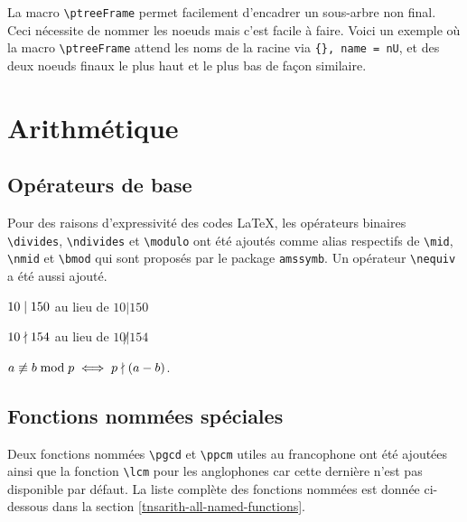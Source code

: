 \documentclass[12pt,a4paper]{book}
\makeatletter
\newcommand\env[1]{\texttt{#1}}
\newcommand\macro[1]{\env{\textbackslash{}#1}}
\theoremstyle{definition}
\newcounter{paraexample}[subsubsection]
\newcommand\@newexample@abstract[2]{%
	\paragraph{%
		#1%
		\if\relax\detokenize{#2}\relax\else {} -- #2\fi%
	}%
}
\newcommand\newparaexample{\@ifstar{\@newparaexample@star}{\@newparaexample@no@star}}
\newcommand\@newparaexample@no@star[1]{%
	\refstepcounter{paraexample}%
	\@newexample@abstract{Exemple \theparaexample}{#1}%
}
\newcommand\@newparaexample@star[1]{%
	\@newexample@abstract{Exemple}{#1}%
}
\makeatother
\begin{document}
{{




\newparaexample{Des cadres non finaux}


La macro \macro{ptreeFrame} permet facilement d'encadrer un sous-arbre non final.
Ceci nécessite de nommer les noeuds mais c'est facile à faire.
Voici un exemple où la macro \macro{ptreeFrame} attend les noms de la racine via \verb#{}, name = nU#, et des deux noeuds finaux le plus haut et le plus bas de façon similaire.

\chapter{Arithmétique}

\section{Opérateurs de base}

Pour des raisons d'expressivité des codes \LaTeX{}, les opérateurs binaires \macro{divides}, \macro{ndivides} et \macro{modulo} ont été ajoutés comme alias respectifs de \macro{mid}, \macro{nmid} et \macro{bmod} qui sont proposés par le package \verb+amssymb+. Un opérateur \macro{nequiv} a été aussi ajouté.

\begin{latexex}
$10 \mid 150$ au lieu de
$10 | 150$

$10 \nmid 154$ au lieu de
$10 \not| 154$

$a \nequiv b \modulo p
 \iff
 p \ndivides (a - b)$.
\end{latexex}


\section{Fonctions nommées spéciales}


Deux fonctions nommées \macro{pgcd} et \macro{ppcm} utiles au francophone ont été ajoutées ainsi que la fonction \macro{lcm} pour les anglophones car cette dernière n'est pas disponible par défaut.
La liste complète des fonctions nommées est donnée ci-dessous dans la section \ref{tnsarith-all-named-functions}.

}}
\end{document}
